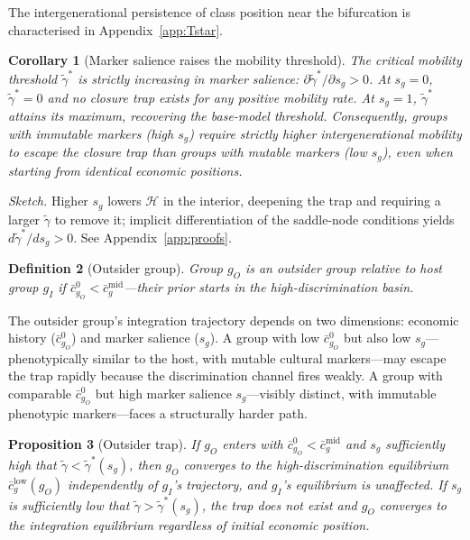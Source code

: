 \documentclass[pdflatex,sn-basic]{sn-jnl}
\theoremstyle{thmstyleone}
\newtheorem{proposition}{Proposition}
\newtheorem{corollary}[proposition]{Corollary}
\newtheorem{definition}[proposition]{Definition}
\numberwithin{proposition}{subsection}
\begin{document}
The intergenerational persistence of class position near the
bifurcation is characterised in Appendix~\ref{app:Tstar}.

\begin{corollary}[Marker salience raises the mobility threshold]
\label{cor:salience-threshold}
The critical mobility threshold $\tilde{\gamma}^*$ is strictly
increasing in marker salience:
$\partial \tilde{\gamma}^* / \partial s_g > 0$. At $s_g = 0$,
$\tilde{\gamma}^* = 0$ and no closure trap exists for any positive
mobility rate. At $s_g = 1$, $\tilde{\gamma}^*$ attains its maximum,
recovering the base-model threshold. Consequently, groups with
immutable markers (high $s_g$) require strictly higher
intergenerational mobility to escape the closure trap than groups
with mutable markers (low $s_g$), even when starting from identical
economic positions.
\end{corollary}

\noindent\emph{Sketch.} Higher $s_g$ lowers $\mathcal{H}$ in the interior,
deepening the trap and requiring a larger $\tilde{\gamma}$ to remove it;
implicit differentiation of the saddle-node conditions yields
$d\tilde{\gamma}^*/ds_g > 0$. See Appendix~\ref{app:proofs}.

\begin{definition}[Outsider group]
Group $g_O$ is an outsider group relative to host group $g_I$ if
$\bar{c}_{g_O}^0 < \bar{c}_g^{\mathrm{mid}}$---their prior starts
in the high-discrimination basin.
\end{definition}

The outsider group's integration trajectory depends on two dimensions:
economic history ($\bar{c}_{g_O}^0$) and marker salience ($s_g$).
A group with low $\bar{c}_{g_O}^0$ but also low $s_g$---phenotypically
similar to the host, with mutable cultural markers---may escape
the trap rapidly because the discrimination channel fires weakly.
A group with comparable $\bar{c}_{g_O}^0$ but high marker salience $s_g$---visibly
distinct, with immutable phenotypic markers---faces a structurally
harder path.

\begin{proposition}[Outsider trap]
\label{prop:enemy}
If $g_O$ enters with $\bar{c}_{g_O}^0 < \bar{c}_g^{\mathrm{mid}}$
and $s_g$ sufficiently high that $\tilde{\gamma} <
\tilde{\gamma}^*(s_g)$, then $g_O$ converges to the
high-discrimination equilibrium $\bar{c}_g^{\mathrm{low}}(g_O)$ independently
of $g_I$'s trajectory, and $g_I$'s equilibrium is unaffected.
If $s_g$ is sufficiently low that $\tilde{\gamma} >
\tilde{\gamma}^*(s_g)$, the trap does not exist and $g_O$
converges to the integration equilibrium regardless of initial
economic position.
\end{proposition}
\end{document}
